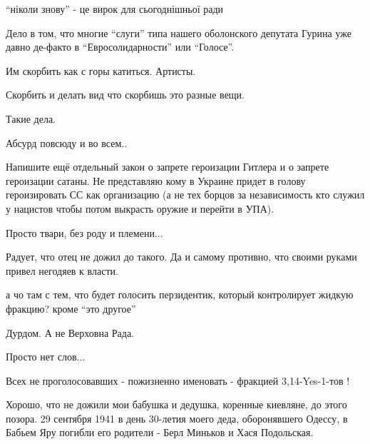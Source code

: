 \begin{itemize}

\enquote{ніколи знову} - це вирок для сьогоднішньої ради


Дело в том, что многие \enquote{слуги} типа нашего оболонского депутата Гурина уже
давно де-факто в \enquote{Евросолидарности} или \enquote{Голосе}.


Им скорбить как с горы катиться. Артисты.


Скорбить и делать вид что скорбишь это разные вещи.


Такие дела.


Абсурд повсюду и во всем..


Напишите ещё отдельный закон о запрете героизации Гитлера и о запрете
героизации сатаны. Не представляю кому в Украине придет в голову героизировать
СС как организацию (а не тех борцов за независимость кто служил у нацистов
чтобы потом выкрасть оружие и перейти в УПА).



Просто твари, без роду и племени...


Радует, что отец не дожил до такого. Да и самому противно, что своими руками привел негодяев к власти.


а чо там с тем, что будет голосить перзидентик, который контролирует жидкую фракцию?
кроме \enquote{это другое}


Дурдом. А не Верховна Рада.

Просто нет слов...

Всех не проголосовавших - пожизненно именовать - фракцией 3,14-Yes-1-тов !


Хорошо, что не дожили мои бабушка и дедушка, коренные киевляне, до этого
позора. 29 сентября 1941 в день 30-летия моего деда, оборонявшего Одессу, в
Бабьем Яру погибли его родители - Берл Миньков и Хася Подольская.


\end{itemize}
